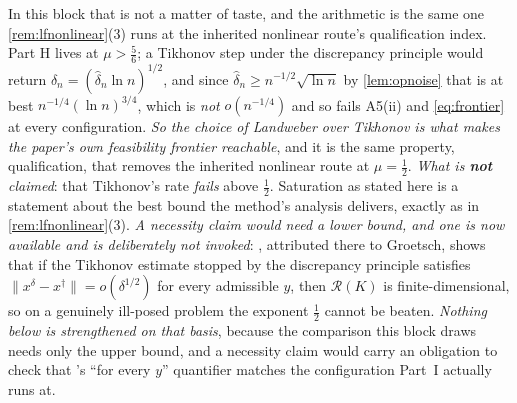 \begin{remark}
In this block that is not a matter of taste, and the arithmetic is the same one
\cref{rem:lfnonlinear}(3) runs at the inherited nonlinear route's qualification index. Part H lives at
$\mu>\tfrac56$; a Tikhonov step under the discrepancy principle would return
$\delta_n=(\hat\delta_n\ln n)^{1/2}$, and since $\hat\delta_n\ge n^{-1/2}\sqrt{\ln n}$ by
\cref{lem:opnoise} that is at best $n^{-1/4}(\ln n)^{3/4}$, which is \emph{not} $o(n^{-1/4})$ and so
fails A5(ii) and \eqref{eq:frontier} at every configuration. \emph{So the choice of Landweber over
Tikhonov is what makes the paper's own feasibility frontier reachable}, and it is the same property, 
qualification, that removes the inherited nonlinear route at $\mu=\tfrac12$.
\emph{What is \textbf{not} claimed}: that Tikhonov's rate \emph{fails} above $\tfrac12$. Saturation as
stated here is a statement about the best bound the method's analysis delivers, exactly as in
\cref{rem:lfnonlinear}(3). \emph{A necessity claim would need a lower bound, and one is now
available and is deliberately not invoked}: \citet[Prop.~4.20]{engl2000}, attributed there to
Groetsch, shows that if the Tikhonov estimate stopped by the discrepancy principle satisfies
$\|x^{\delta}-x^\dagger\|=o(\delta^{1/2})$ for every admissible $y$, then $\mathcal R(K)$ is
finite-dimensional, so on a genuinely ill-posed problem the exponent $\tfrac12$ cannot be beaten.
\emph{Nothing below is strengthened on that basis}, because the comparison this block draws needs only
the upper bound, and a necessity claim would carry an obligation to check that
\citeauthor{engl2000}'s ``for every $y$'' quantifier matches the configuration Part~I actually runs at.
\end{remark}

